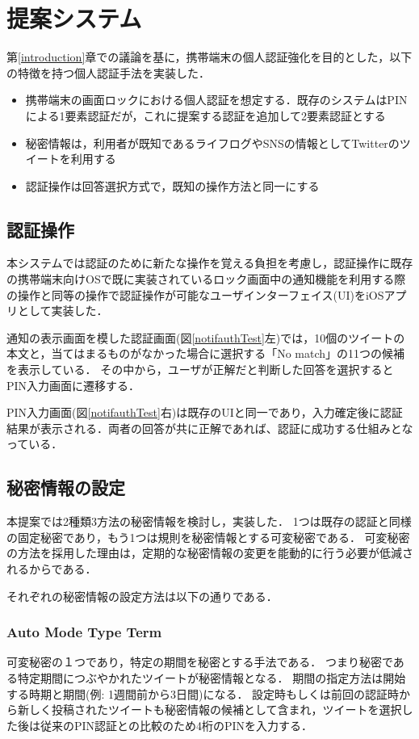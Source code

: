 \documentclass[twocolumn, a4paper, 9pt]{UECIEresume}
\begin{document}
\section{提案システム}
第\ref{introduction}章での議論を基に，携帯端末の個人認証強化を目的とした，以下の特徴を持つ個人認証手法を実装した．
\begin{itemize}
  \item 携帯端末の画面ロックにおける個人認証を想定する．既存のシステムはPINによる1要素認証だが，これに提案する認証を追加して2要素認証とする
  \item 秘密情報は，利用者が既知であるライフログやSNSの情報としてTwitterのツイートを利用する
  \item 認証操作は回答選択方式で，既知の操作方法と同一にする
\end{itemize}

\subsection{認証操作}
本システムでは認証のために新たな操作を覚える負担を考慮し，認証操作に既存の携帯端末向けOSで既に実装されているロック画面中の通知機能を利用する際の操作と同等の操作で認証操作が可能なユーザインターフェイス(UI)をiOSアプリとして実装した．

通知の表示画面を模した認証画面(図\ref{notifauthTest}左)では，10個のツイートの本文と，当てはまるものがなかった場合に選択する「No match」の11つの候補を表示している．
その中から，ユーザが正解だと判断した回答を選択するとPIN入力画面に遷移する．

PIN入力画面(図\ref{notifauthTest}右)は既存のUIと同一であり，入力確定後に認証結果が表示される．両者の回答が共に正解であれば、認証に成功する仕組みとなっている．

\subsection{秘密情報の設定}
本提案では2種類3方法の秘密情報を検討し，実装した．
1つは既存の認証と同様の固定秘密であり，もう1つは規則を秘密情報とする可変秘密である．
可変秘密の方法を採用した理由は，定期的な秘密情報の変更を能動的に行う必要が低減されるからである．

それぞれの秘密情報の設定方法は以下の通りである．

\subsubsection{Auto Mode Type Term}
可変秘密の１つであり，特定の期間を秘密とする手法である．
つまり秘密である特定期間につぶやかれたツイートが秘密情報となる．
期間の指定方法は開始する時期と期間(例: 1週間前から3日間)になる．
設定時もしくは前回の認証時から新しく投稿されたツイートも秘密情報の候補として含まれ，ツイートを選択した後は従来のPIN認証との比較のため4桁のPINを入力する．
\end{document}
